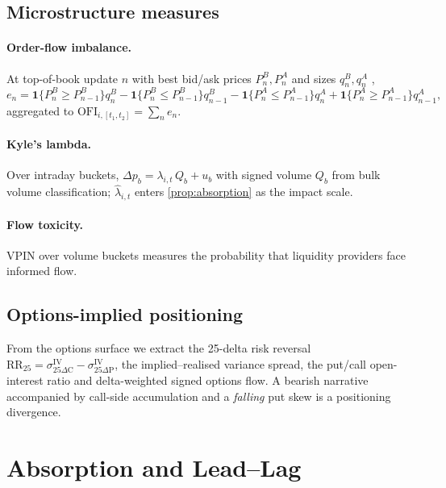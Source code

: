 \documentclass[11pt,a4paper]{article}
\theoremstyle{plain}
\theoremstyle{definition}
\theoremstyle{remark}
\newcommand{\ind}{\mathbf{1}}
\begin{document}
\subsection{Microstructure measures}
\paragraph{Order-flow imbalance.} At top-of-book update $n$ with best bid/ask prices $P^B_n,P^A_n$ and sizes $q^B_n,q^A_n$ \citep{cont2014},
\begin{equation}
  e_n=\ind\{P^B_n\ge P^B_{n-1}\}q^B_n-\ind\{P^B_n\le P^B_{n-1}\}q^B_{n-1}-\ind\{P^A_n\le P^A_{n-1}\}q^A_n+\ind\{P^A_n\ge P^A_{n-1}\}q^A_{n-1},
\end{equation}
aggregated to $\mathrm{OFI}_{i,[t_1,t_2]}=\sum_{n}e_n$.

\paragraph{Kyle's lambda.} Over intraday buckets, $\Delta p_{b}=\lambda_{i,t}\,Q_b+u_b$ with signed volume $Q_b$ from bulk volume classification; $\hat\lambda_{i,t}$ enters \cref{prop:absorption} as the impact scale.

\paragraph{Flow toxicity.} VPIN \citep{easley2012} over volume buckets measures the probability that liquidity providers face informed flow.

\subsection{Options-implied positioning}
From the options surface we extract the 25-delta risk reversal $\mathrm{RR}_{25}=\sigma^{\mathrm{IV}}_{25\Delta\text{C}}-\sigma^{\mathrm{IV}}_{25\Delta\text{P}}$, the implied--realised variance spread, the put/call open-interest ratio and delta-weighted signed options flow. A bearish narrative accompanied by call-side accumulation and a \emph{falling} put skew is a positioning divergence.

\section{Absorption and Lead--Lag}\label{sec:absorption}
\end{document}
